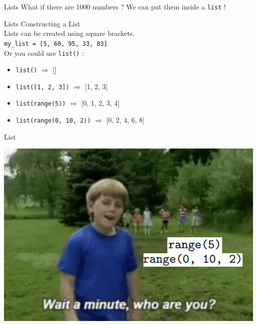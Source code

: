 \documentclass{beamer}
\begin{document}
    \begin{frame}{Lists}
        What if there are 1000 numbers ?
        \vskip 20pt 
        We can put them inside a \texttt{list} !
    \end{frame}
    
    \begin{frame}{Lists}
        \color{blue} \Large Constructing a List \\
        \color{black} \normalsize \vskip 5pt
        Lists can be created using square brackets.\\
        \texttt{my\_list = [5, 60, 95, 33, 83]} \\ 
        Or you could use \texttt{list()} : 
        \begin{itemize}
            \item \texttt{list()} $\Rightarrow$ []
            \item \texttt{list([1, 2, 3])} $\Rightarrow$ [1, 2, 3]
            \item \texttt{list(range(5))} $\Rightarrow$ [0, 1, 2, 3, 4]
            \item \texttt{list(range(0, 10, 2))} $\Rightarrow$ [0, 2, 4, 6, 8]
        \end{itemize}
    \end{frame}

    \begin{frame}{List}
        \begin{center}
            \includegraphics[scale=0.6]{Who_are_you.png}
        \end{center}
        
    \end{frame}
\end{document}
